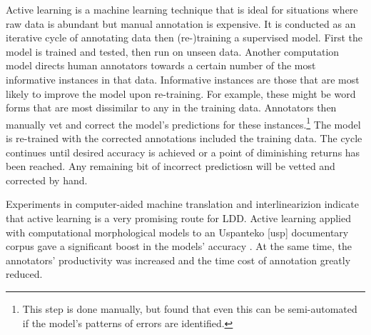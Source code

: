 \documentclass[12pt]{article}
\begin{document}
Active learning is a machine learning technique that is ideal for situations where raw data is abundant but manual annotation is expensive. It is conducted as an iterative cycle of annotating data then (re-)training a supervised model. First the model is trained and tested, then run on unseen data. Another computation model directs human annotators towards a certain number of the most informative instances in that data. Informative instances are those that are most likely to improve the model upon re-training. For example, these might be word forms that are most dissimilar to any in the training data. Annotators then manually vet and correct the model's predictions for these instances.\footnote{This step is done manually, but  found that even this can be semi-automated if the model's patterns of errors are identified.} The model is re-trained with the corrected annotations included the training data. The cycle continues until desired accuracy is achieved or a point of diminishing returns has been reached. Any remaining bit of incorrect predictiosn will be vetted and corrected by hand.

Experiments in computer-aided machine translation \cite{kothur_document-level_2018} and interlinearizion \cite{palmer_semi-automated_2009,palmer_evaluating_2009,palmer_computational_2010} indicate that active learning is a very promising route for LDD. Active learning applied with computational morphological models to an Uspanteko [usp] documentary corpus gave a significant boost in the models' accuracy \cite{palmer_semi-automated_2009}. At the same time, the annotators' productivity was increased and the time cost of annotation greatly reduced.
\end{document}
